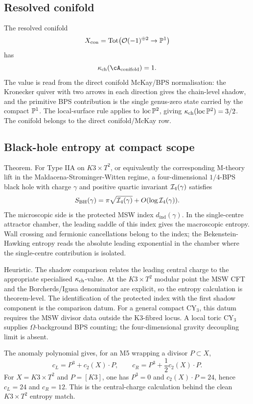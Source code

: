 \subsection*{Resolved conifold}

The resolved conifold
\[
X_{\mathrm{con}}=\mathrm{Tot}\bigl(\mathcal{O}(-1)^{\oplus 2}\to \mathbb{P}^1\bigr)
\]
has
\[
\kappa_{\mathrm{ch}}(\cA_{\mathrm{conifold}})=1.
\]
The value is read from the direct conifold McKay/BPS normalisation: the
Kronecker quiver with two arrows in each direction gives the
chain-level shadow, and the primitive BPS contribution is the single
genus-zero state carried by the compact \(\mathbb{P}^1\). The local-surface
rule applies to \(\mathrm{loc}\,\mathbb{P}^2\), giving
\(\kappa_{\mathrm{ch}}(\mathrm{loc}\,\mathbb{P}^2)=3/2\). The conifold belongs to the direct
conifold/McKay row.

\subsection*{Black-hole entropy at compact scope}

Theorem. For Type IIA on \(K3\times T^2\), or equivalently the
corresponding M-theory lift in the Maldacena-Strominger-Witten
regime, a four-dimensional \(1/4\)-BPS black hole with charge
\(\gamma\) and positive quartic invariant \(\mathcal{I}_4(\gamma)\) satisfies
\[
S_{\mathrm{BH}}(\gamma)
=\pi\sqrt{\mathcal{I}_4(\gamma)}
+O(\log \mathcal{I}_4(\gamma)).
\]
The microscopic side is the protected MSW index
\(d_{\mathrm{ind}}(\gamma)\). In the single-centre attractor chamber,
the leading saddle of this index gives the macroscopic entropy. Wall
crossing and fermionic cancellations belong to the index; the
Bekenstein-Hawking entropy reads the absolute leading exponential in
the chamber where the single-centre contribution is isolated.

Heuristic. The shadow comparison relates the leading central charge to
the appropriate specialised \(\kappa_{\mathrm{ch}}\)-value. At the \(K3\times T^2\)
modular point the MSW CFT and the Borcherds/Igusa denominator are
explicit, so the entropy calculation is theorem-level. The
identification of the protected index with the first shadow component
is the comparison datum. For a general compact CY\(_3\), this datum
requires the MSW divisor data outside the K3-fibred locus. A local
toric CY\(_3\) supplies \(\Omega\)-background BPS counting; the
four-dimensional gravity decoupling limit is absent.

The anomaly polynomial gives, for an M5 wrapping a divisor
\(P\subset X\),
\[
c_L=P^3+c_2(X)\cdot P,\qquad
c_R=P^3+\frac12 c_2(X)\cdot P.
\]
For \(X=K3\times T^2\) and \(P=[K3]\), one has \(P^3=0\) and
\(c_2(X)\cdot P=24\), hence \(c_L=24\) and \(c_R=12\). This is the
central-charge calculation behind the clean \(K3\times T^2\) entropy
match.

